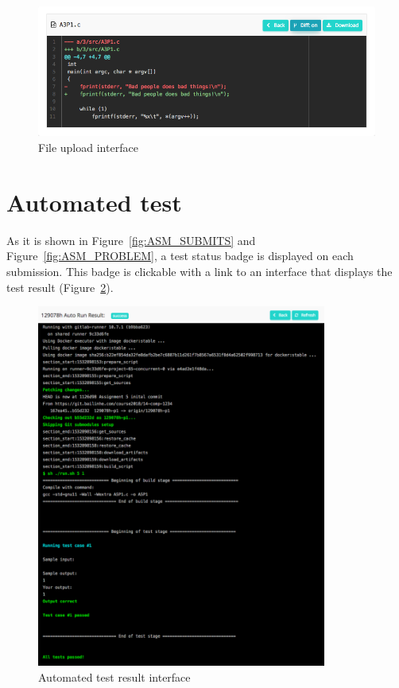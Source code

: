 \begin{figure}[H]
    \centering
        \includegraphics[width=1.0\textwidth]{figures/view-file-diff}
    \caption{File upload interface}
    \label{fig:VIEW_FILE_DIFF}
\end{figure}


\section{Automated test}
As it is shown in Figure~\ref{fig:ASM_SUBMITS} and Figure~\ref{fig:ASM_PROBLEM},
a test status badge is displayed on each submission. This badge is clickable
with a link to an interface that displays the test result
(Figure~\ref{fig:TRACE}).

\begin{figure}[H]
    \centering
        \includegraphics[width=0.85\textwidth]{figures/job-trace}
    \caption{Automated test result interface}
    \label{fig:TRACE}
\end{figure}


